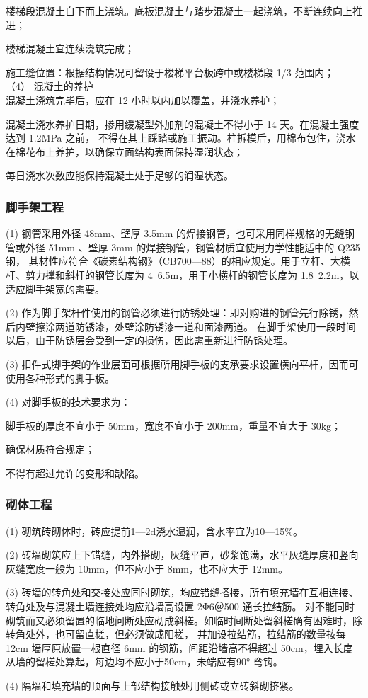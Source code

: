  楼梯段混凝土自下而上浇筑。底板混凝土与踏步混凝土一起浇筑，不断连续向上推进；

 楼梯混凝土宜连续浇筑完成；

 施工缝位置：根据结构情况可留设于楼梯平台板跨中或楼梯段 1/3 范围内； \\

（4） 混凝土的养护\\

 混凝土浇筑完毕后，应在 12 小时以内加以覆盖，并浇水养护；

 混凝土浇水养护日期，掺用缓凝型外加剂的混凝土不得小于 14 天。在混凝土强度达到 1.2MPa 之前，
不得在其上踩踏或施工振动。柱拆模后，用棉布包住，浇水在棉花布上养护，以确保立面结构表面保持湿润状态；

 每日浇水次数应能保持混凝土处于足够的润湿状态。


\subsubsection{脚手架工程}

(1)  钢管采用外径 48mm、壁厚 3.5mm 的焊接钢管，也可采用同样规格的无缝钢管或外径 51mm 、壁厚 3mm 的焊接钢管，钢管材质宜使用力学性能适中的 Q235 钢，
其材性应符合《碳素结构钢》（CB700—88）的相应规定。用于立杆、大横杆、剪力撑和斜杆的钢管长度为 4~6.5m，用于小横杆的钢管长度为 1.8~2.2m，以适应脚手架宽的需要。

(2)  作为脚手架杆件使用的钢管必须进行防锈处理：即对购进的钢管先行除锈，然后内壁擦涂两道防锈漆，处壁涂防锈漆一道和面漆两道。
在脚手架使用一段时间以后，由于防锈层会受到一定的损伤，因此需重新进行防锈处理。

(3)  扣件式脚手架的作业层面可根据所用脚手板的支承要求设置横向平杆，因而可使用各种形式的脚手板。

(4) 对脚手板的技术要求为：

 脚手板的厚度不宜小于 50mm，宽度不宜小于 200mm，重量不宜大于 30kg；

 确保材质符合规定；

 不得有超过允许的变形和缺陷。


\subsubsection{砌体工程}

(1) 砌筑砖砌体时，砖应提前1—2d浇水湿润，含水率宜为10—15\%。

(2) 砖墙砌筑应上下错缝，内外搭砌，灰缝平直，砂浆饱满，水平灰缝厚度和竖向灰缝宽度一般为 10mm，但不应小于 8mm，也不应大于 12mm。

(3) 砖墙的转角处和交接处应同时砌筑，均应错缝搭接，所有填充墙在互相连接、转角处及与混凝土墙连接处均应沿墙高设置 2Φ6＠500 通长拉结筋。
对不能同时砌筑而又必须留置的临地问断处应砌成斜槎。如临时间断处留斜槎确有困难时，除转角处外，也可留直槎，但必须做成阳槎，
并加设拉结筋，拉结筋的数量按每 12cm 墙厚原放置一根直径 6mm 的钢筋，间距沿墙高不得超过 50cm，埋入长度从墙的留槎处算起，每边均不应小于50cm，未端应有90° 弯钩。

(4) 隔墙和填充墙的顶面与上部结构接触处用侧砖或立砖斜砌挤紧。
